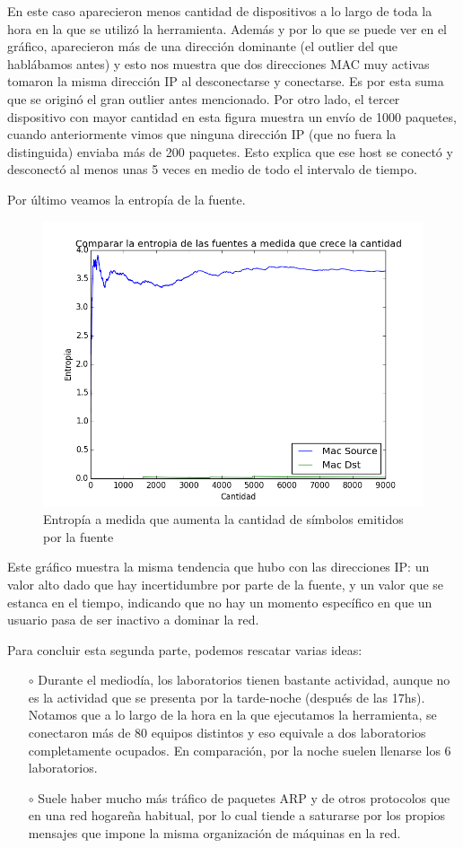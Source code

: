 En este caso aparecieron menos cantidad de dispositivos a lo largo de toda la hora en la que se utiliz\'o la herramienta. Adem\'as y por lo que se puede ver en el gr\'afico, aparecieron m\'as de una direcci\'on dominante (el outlier del que habl\'abamos antes) y esto nos muestra que dos direcciones MAC muy activas tomaron la misma direcci\'on IP al desconectarse y conectarse. Es por esta suma que se origin\'o el gran outlier antes mencionado. Por otro lado, el tercer dispositivo con mayor cantidad en esta figura muestra un env\'io de 1000 paquetes, cuando anteriormente vimos que ninguna direcci\'on IP (que no fuera la distinguida) enviaba m\'as de 200 paquetes. Esto explica que ese host se conect\'o y desconect\'o al menos unas 5 veces en medio de todo el intervalo de tiempo.\newline

Por \'ultimo veamos la entrop\'ia de la fuente.

\begin{figure}[h!]
\centering
\includegraphics[width=0.7\linewidth]{imagenes/exp2/10entropiaMacDstyMacSource}
\caption{Entrop\'ia a medida que aumenta la cantidad de s\'imbolos emitidos por la fuente}
\label{exp1grafico1}
\end{figure}

Este gr\'afico muestra la misma tendencia que hubo con las direcciones IP: un valor alto dado que hay incertidumbre por parte de la fuente, y un valor que se estanca en el tiempo, indicando que no hay un momento espec\'ifico en que un usuario pasa de ser inactivo a dominar la red.\newline

Para concluir esta segunda parte, podemos rescatar varias ideas:

\begin{itemize}
\item[$\circ$]Durante el mediod\'ia, los laboratorios tienen bastante actividad, aunque no es la actividad que se presenta por la tarde-noche (despu\'es de las 17hs). Notamos que a lo largo de la hora en la que ejecutamos la herramienta, se conectaron m\'as de 80 equipos distintos y eso equivale a dos laboratorios completamente ocupados. En comparaci\'on, por la noche suelen llenarse los 6 laboratorios.
\item[$\circ$]Suele haber mucho m\'as tr\'afico de paquetes ARP y de otros protocolos que en una red hogare\~na habitual, por lo cual tiende a saturarse por los propios mensajes que impone la misma organizaci\'on de m\'aquinas en la red.
\end{itemize}

